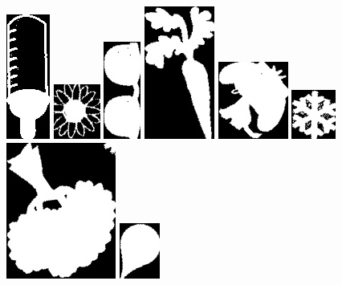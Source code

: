 \documentclass[10pt,a4paper]{article}
\begin{document}
\begin{center}
\includegraphics[scale=0.25]{2.3/sign39.jpg}
\includegraphics[scale=0.25]{2.3/sign40.jpg}
\includegraphics[scale=0.25]{2.3/sign41.jpg}
\includegraphics[scale=0.25]{2.3/sign42.jpg}
\includegraphics[scale=0.25]{2.3/sign43.jpg}
\includegraphics[scale=0.25]{2.3/sign44.jpg}
\includegraphics[scale=0.25]{2.3/sign45.jpg}
\includegraphics[scale=0.25]{2.3/sign46.jpg}
\end{center}
\end{document}
